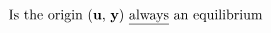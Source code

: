 \documentclass[preview]{standalone}
\begin{document}
\begin{align*}
\text{Is the origin (\textbf{u}, \textbf{y}) \underline{always} an equilibrium}
\end{align*}
\end{document}
